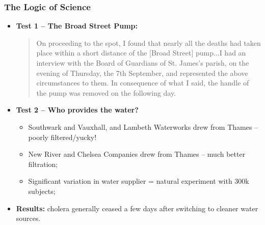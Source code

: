 \documentclass[aspectratio=169]{beamer}
\theoremstyle{principle}
\begin{document}
\begin{frame}
\frametitle{The Logic of Science}
\begin{itemize}
\item \textbf{Test 1 -- The Broad Street Pump:}
\begin{center}
\begin{quote}
On proceeding to the spot, I found that nearly all the deaths had taken place within a short distance of the [Broad Street] pump...I had an interview with the Board of Guardians of St. James's parish, on the evening of Thursday, the 7th September, and represented the above circumstances to them. In consequence of what I said, the handle of the pump was removed on the following day.
\end{quote}
\end{center}
\bigskip
\item \textbf{Test 2 -- Who provides the water?}
\begin{itemize}
\item Southwark and Vauxhall, and Lambeth Waterworks drew from Thames -- poorly filtered/yucky!
\item New River and Chelsea Companies drew from Thames -- much better filtration;
\item Significant variation in water supplier = natural experiment with 300k subjects;
\end{itemize}
\bigskip
\item \textbf{Results:} cholera generally ceased a few days after switching to cleaner water sources.
\end{itemize}

\end{frame}
\end{document}
